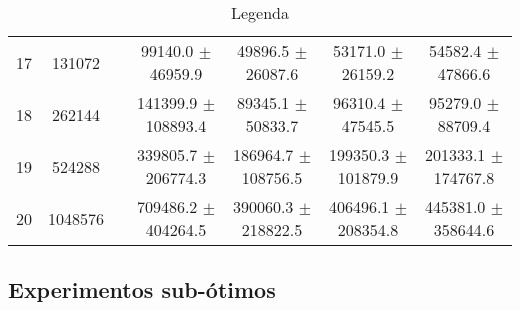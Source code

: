\begin{table}
{\begin{tabular}{cc c cccc}
17 &  131072 && 99140.0 $\pm$ 46959.9 & 49896.5 $\pm$ 26087.6 & 53171.0 $\pm$ 26159.2 & 54582.4 $\pm$ 47866.6 \\
18 &  262144 && 141399.9 $\pm$ 108893.4 & 89345.1 $\pm$ 50833.7 & 96310.4 $\pm$ 47545.5 & 95279.0 $\pm$ 88709.4 \\
19 &  524288 && 339805.7 $\pm$ 206774.3 & 186964.7 $\pm$ 108756.5 & 199350.3 $\pm$ 101879.9 & 201333.1 $\pm$ 174767.8 \\
20 & 1048576 && 709486.2 $\pm$ 404264.5 & 390060.3 $\pm$ 218822.5 & 406496.1 $\pm$ 208354.8 & 445381.0 $\pm$ 358644.6 \\
\end{tabular}
}
\caption{Legenda}
\label{tab:pucs:small:cost}
\end{table}

\subsection{Experimentos sub-ótimos}
